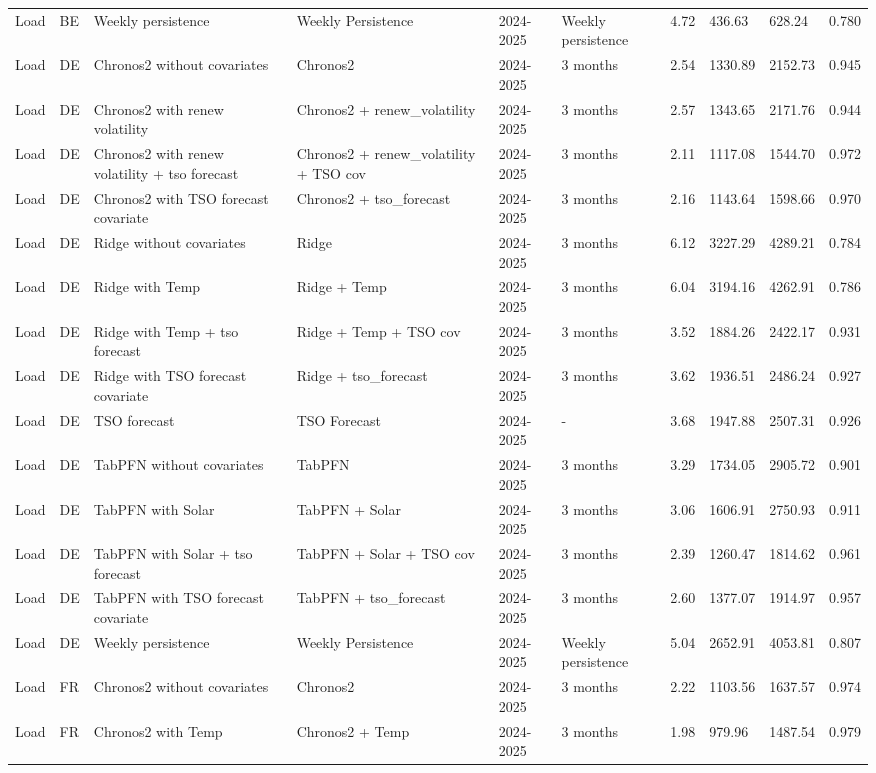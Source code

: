 \begin{longtable}{llllllllll}
Load & BE & Weekly persistence & Weekly Persistence & 2024-2025 & Weekly persistence & 4.72 & 436.63 & 628.24 & 0.780 \\
Load & DE & Chronos2 without covariates & Chronos2 & 2024-2025 & 3 months & 2.54 & 1330.89 & 2152.73 & 0.945 \\
Load & DE & Chronos2 with renew volatility & Chronos2 + renew\_volatility & 2024-2025 & 3 months & 2.57 & 1343.65 & 2171.76 & 0.944 \\
Load & DE & Chronos2 with renew volatility + tso forecast & Chronos2 + renew\_volatility + TSO cov & 2024-2025 & 3 months & 2.11 & 1117.08 & 1544.70 & 0.972 \\
Load & DE & Chronos2 with TSO forecast covariate & Chronos2 + tso\_forecast & 2024-2025 & 3 months & 2.16 & 1143.64 & 1598.66 & 0.970 \\
Load & DE & Ridge without covariates & Ridge & 2024-2025 & 3 months & 6.12 & 3227.29 & 4289.21 & 0.784 \\
Load & DE & Ridge with Temp & Ridge + Temp & 2024-2025 & 3 months & 6.04 & 3194.16 & 4262.91 & 0.786 \\
Load & DE & Ridge with Temp + tso forecast & Ridge + Temp + TSO cov & 2024-2025 & 3 months & 3.52 & 1884.26 & 2422.17 & 0.931 \\
Load & DE & Ridge with TSO forecast covariate & Ridge + tso\_forecast & 2024-2025 & 3 months & 3.62 & 1936.51 & 2486.24 & 0.927 \\
Load & DE & TSO forecast & TSO Forecast & 2024-2025 & - & 3.68 & 1947.88 & 2507.31 & 0.926 \\
Load & DE & TabPFN without covariates & TabPFN & 2024-2025 & 3 months & 3.29 & 1734.05 & 2905.72 & 0.901 \\
Load & DE & TabPFN with Solar & TabPFN + Solar & 2024-2025 & 3 months & 3.06 & 1606.91 & 2750.93 & 0.911 \\
Load & DE & TabPFN with Solar + tso forecast & TabPFN + Solar + TSO cov & 2024-2025 & 3 months & 2.39 & 1260.47 & 1814.62 & 0.961 \\
Load & DE & TabPFN with TSO forecast covariate & TabPFN + tso\_forecast & 2024-2025 & 3 months & 2.60 & 1377.07 & 1914.97 & 0.957 \\
Load & DE & Weekly persistence & Weekly Persistence & 2024-2025 & Weekly persistence & 5.04 & 2652.91 & 4053.81 & 0.807 \\
Load & FR & Chronos2 without covariates & Chronos2 & 2024-2025 & 3 months & 2.22 & 1103.56 & 1637.57 & 0.974 \\
Load & FR & Chronos2 with Temp & Chronos2 + Temp & 2024-2025 & 3 months & 1.98 & 979.96 & 1487.54 & 0.979 \\

\end{longtable}
